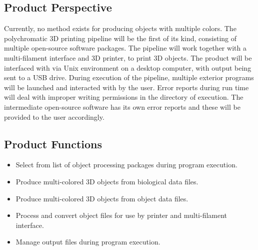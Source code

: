 \documentclass[letterpaper, onecolumn, draftclsnofoot, 10pt, compsoc]{IEEEtran}
\begin{document}
	\subsection{Product Perspective} %
	Currently, no method exists for producing objects with multiple colors.
	The polychromatic 3D printing pipeline will be the first of its kind, consisting of multiple open-source software packages. 
	The pipeline will work together with a multi-filament interface and 3D printer, to print 3D objects. 
	The product will be interfaced with via Unix environment on a desktop computer, with output being sent to a USB drive.
    During execution of the pipeline, multiple exterior programs will be launched and interacted with by the user. 
    Error reports during run time will deal with improper writing permissions in the directory of execution.
    The intermediate open-source software has its own error reports and these will be provided to the user accordingly.
    
\subsection{Product Functions} %
\begin{itemize}
	\item Select from list of object processing packages during program execution. 
	\item Produce multi-colored 3D objects from biological data files.
    \item Produce multi-colored 3D objects from object data files.
    \item Process and convert object files for use by printer and multi-filament interface.
    \item Manage output files during program execution.
\end{itemize}
\end{document}
